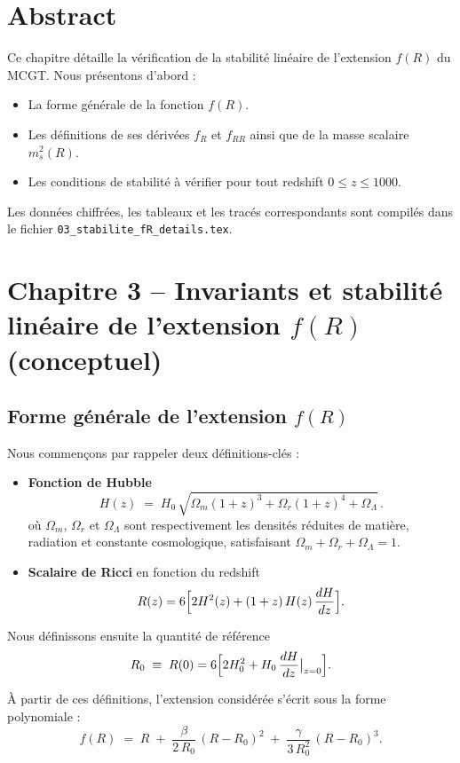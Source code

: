 \section*{Abstract}
Ce chapitre détaille la vérification de la stabilité linéaire de l’extension $f(R)$ du MCGT. Nous présentons d’abord :
\begin{itemize}
  \item La forme générale de la fonction $f(R)$.
  \item Les définitions de ses dérivées $f_{R}$ et $f_{RR}$ ainsi que de la masse scalaire $m_{s}^{2}(R)$.
  \item Les conditions de stabilité à vérifier pour tout redshift $0 \le z \le 1000$.
\end{itemize}
Les données chiffrées, les tableaux et les tracés correspondants sont compilés dans le fichier \texttt{03\_stabilite\_fR\_details.tex}.

\bigskip
\section{Chapitre 3 – Invariants et stabilité linéaire de l’extension $f(R)$ (conceptuel)}

\subsection{Forme générale de l’extension $f(R)$}

Nous commençons par rappeler deux définitions-clés :

\begin{itemize}
  \item \textbf{Fonction de Hubble}
    \[
      H(z) \;=\; H_0\,\sqrt{\Omega_m(1+z)^3 + \Omega_r(1+z)^4 + \Omega_\Lambda}\,.
    \]
    où \(\Omega_m\), \(\Omega_r\) et \(\Omega_\Lambda\) sont respectivement les densités réduites de matière, radiation et constante cosmologique, satisfaisant \(\Omega_m+\Omega_r+\Omega_\Lambda=1\).
  \item \textbf{Scalaire de Ricci} en fonction du redshift
    \[
      R(z)
      =6\Bigl[2H^2(z)+(1+z)\,H(z)\,\frac{dH}{dz}\Bigr].
    \]
\end{itemize}

Nous définissons ensuite la quantité de référence
\[
  R_0 \;\equiv\; R(0)
    =6\Bigl[2H_0^{2}
      + H_{0}\,\frac{dH}{dz}\bigl|_{z=0}\Bigr].
\]

À partir de ces définitions, l’extension considérée s’écrit sous la forme polynomiale :
\[
  f(R) \;=\; R
    \;+\; \frac{\beta}{2\,R_{0}}\,(R - R_{0})^{2}
    \;+\; \frac{\gamma}{3\,R_{0}^{2}}\,(R - R_{0})^{3}.
\]

